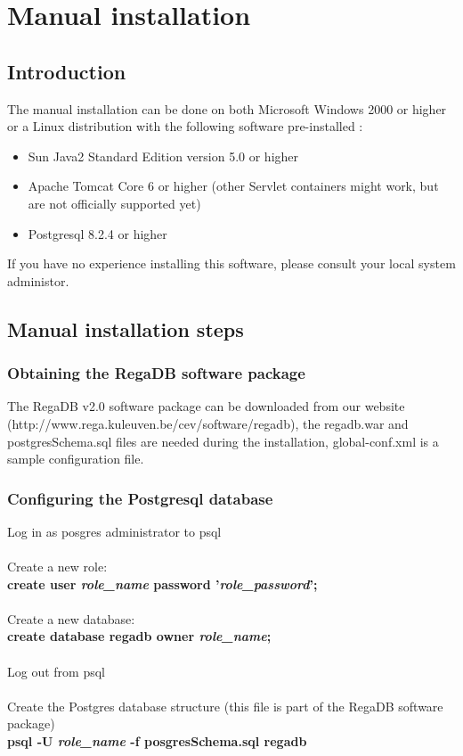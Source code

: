 \chapter{Manual installation}
\label{chapter:manual_install}

\section{Introduction}
The manual installation can be done on both Microsoft Windows 2000 or higher or a Linux distribution with the following software pre-installed : 
\begin{itemize}
\item Sun Java2 Standard Edition version 5.0 or higher
\item Apache Tomcat Core 6 or higher (other Servlet containers might work, but are not officially supported yet)
\item Postgresql 8.2.4 or higher
\end{itemize}
If you have no experience installing this software, please consult your local system administor.

\section{Manual installation steps}
\subsection{Obtaining the RegaDB software package}
The RegaDB v2.0 software package can be downloaded from our website (http://www.rega.kuleuven.be/cev/software/regadb), the regadb.war and postgresSchema.sql files are needed during the installation, global-conf.xml is a sample configuration file.

\subsection{Configuring the Postgresql database}
Log in as posgres administrator to psql
\\
\\
Create a new role:
\\
\textbf{create user \textit{role\_name} password '\textit{role\_password}';}
\\
\\
Create a new database:
\\
\textbf{create database regadb owner \textit{role\_name};}
\\
\\
Log out from psql
\\
\\
Create the Postgres database structure (this file is part of the RegaDB software package)
\\
\textbf{psql -U \textit{role\_name} -f posgresSchema.sql regadb}

